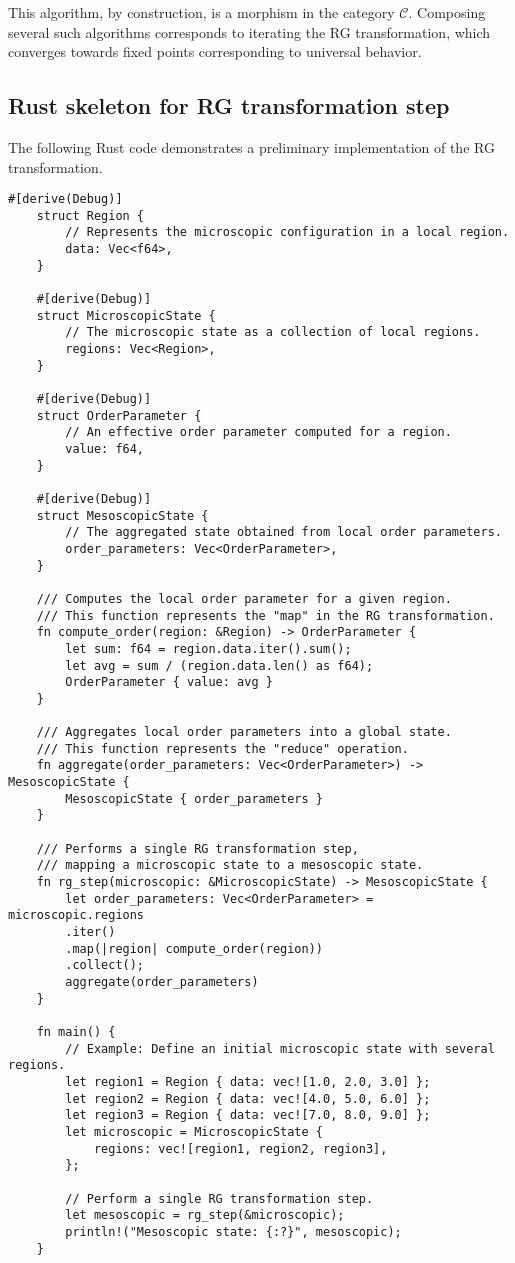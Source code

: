 This algorithm, by construction, is a morphism in the category \(\mathcal{C}\). Composing several such algorithms corresponds to iterating the RG transformation, which converges towards fixed points corresponding to universal behavior.

\subsection{Rust skeleton for RG transformation step}

The following Rust code demonstrates a preliminary implementation of the RG transformation.

\begin{lstlisting}[caption={Rust Implementation of a Single RG Transformation Step}]
	#[derive(Debug)]
	struct Region {
		// Represents the microscopic configuration in a local region.
		data: Vec<f64>,
	}
	
	#[derive(Debug)]
	struct MicroscopicState {
		// The microscopic state as a collection of local regions.
		regions: Vec<Region>,
	}
	
	#[derive(Debug)]
	struct OrderParameter {
		// An effective order parameter computed for a region.
		value: f64,
	}
	
	#[derive(Debug)]
	struct MesoscopicState {
		// The aggregated state obtained from local order parameters.
		order_parameters: Vec<OrderParameter>,
	}
	
	/// Computes the local order parameter for a given region.
	/// This function represents the "map" in the RG transformation.
	fn compute_order(region: &Region) -> OrderParameter {
		let sum: f64 = region.data.iter().sum();
		let avg = sum / (region.data.len() as f64);
		OrderParameter { value: avg }
	}
	
	/// Aggregates local order parameters into a global state.
	/// This function represents the "reduce" operation.
	fn aggregate(order_parameters: Vec<OrderParameter>) -> MesoscopicState {
		MesoscopicState { order_parameters }
	}
	
	/// Performs a single RG transformation step,
	/// mapping a microscopic state to a mesoscopic state.
	fn rg_step(microscopic: &MicroscopicState) -> MesoscopicState {
		let order_parameters: Vec<OrderParameter> = microscopic.regions
		.iter()
		.map(|region| compute_order(region))
		.collect();
		aggregate(order_parameters)
	}
	
	fn main() {
		// Example: Define an initial microscopic state with several regions.
		let region1 = Region { data: vec![1.0, 2.0, 3.0] };
		let region2 = Region { data: vec![4.0, 5.0, 6.0] };
		let region3 = Region { data: vec![7.0, 8.0, 9.0] };
		let microscopic = MicroscopicState {
			regions: vec![region1, region2, region3],
		};
		
		// Perform a single RG transformation step.
		let mesoscopic = rg_step(&microscopic);
		println!("Mesoscopic state: {:?}", mesoscopic);
	}
\end{lstlisting}

